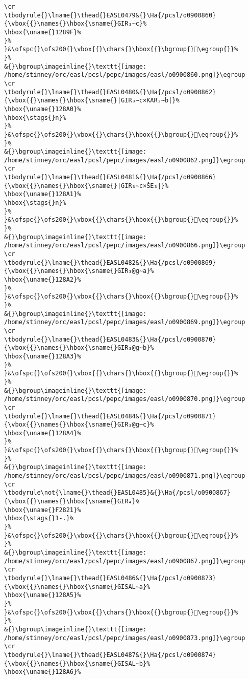 \begin{verbatim}
\cr
\tbodyrule{}\lname{}\thead{}EASL0479&{}\Ha{/pcsl/o0900860}{\vbox{{}\names{}\hbox{\sname{}GIR₃∼c}%
\hbox{\uname{}1289F}%
}%
}&\ofspc{}\ofs200{}\vbox{{}\chars{}\hbox{{}\bgroup{}𒢟\egroup{}}%
}%
&{}\bgroup\imageinline{}\texttt{[image: /home/stinney/orc/easl/pcsl/pepc/images/easl/o0900860.png]}\egroup
\cr
\tbodyrule{}\lname{}\thead{}EASL0480&{}\Ha{/pcsl/o0900862}{\vbox{{}\names{}\hbox{\sname{}|GIR₃∼c×KAR₂∼b|}%
\hbox{\uname{}128A0}%
\hbox{\stags{}n}%
}%
}&\ofspc{}\ofs200{}\vbox{{}\chars{}\hbox{{}\bgroup{}𒢠\egroup{}}%
}%
&{}\bgroup\imageinline{}\texttt{[image: /home/stinney/orc/easl/pcsl/pepc/images/easl/o0900862.png]}\egroup
\cr
\tbodyrule{}\lname{}\thead{}EASL0481&{}\Ha{/pcsl/o0900866}{\vbox{{}\names{}\hbox{\sname{}|GIR₃∼c×ŠE₃|}%
\hbox{\uname{}128A1}%
\hbox{\stags{}n}%
}%
}&\ofspc{}\ofs200{}\vbox{{}\chars{}\hbox{{}\bgroup{}𒢡\egroup{}}%
}%
&{}\bgroup\imageinline{}\texttt{[image: /home/stinney/orc/easl/pcsl/pepc/images/easl/o0900866.png]}\egroup
\cr
\tbodyrule{}\lname{}\thead{}EASL0482&{}\Ha{/pcsl/o0900869}{\vbox{{}\names{}\hbox{\sname{}GIR₃@g∼a}%
\hbox{\uname{}128A2}%
}%
}&\ofspc{}\ofs200{}\vbox{{}\chars{}\hbox{{}\bgroup{}𒢢\egroup{}}%
}%
&{}\bgroup\imageinline{}\texttt{[image: /home/stinney/orc/easl/pcsl/pepc/images/easl/o0900869.png]}\egroup
\cr
\tbodyrule{}\lname{}\thead{}EASL0483&{}\Ha{/pcsl/o0900870}{\vbox{{}\names{}\hbox{\sname{}GIR₃@g∼b}%
\hbox{\uname{}128A3}%
}%
}&\ofspc{}\ofs200{}\vbox{{}\chars{}\hbox{{}\bgroup{}𒢣\egroup{}}%
}%
&{}\bgroup\imageinline{}\texttt{[image: /home/stinney/orc/easl/pcsl/pepc/images/easl/o0900870.png]}\egroup
\cr
\tbodyrule{}\lname{}\thead{}EASL0484&{}\Ha{/pcsl/o0900871}{\vbox{{}\names{}\hbox{\sname{}GIR₃@g∼c}%
\hbox{\uname{}128A4}%
}%
}&\ofspc{}\ofs200{}\vbox{{}\chars{}\hbox{{}\bgroup{}𒢤\egroup{}}%
}%
&{}\bgroup\imageinline{}\texttt{[image: /home/stinney/orc/easl/pcsl/pepc/images/easl/o0900871.png]}\egroup
\cr
\tbodyrule\not{\lname{}\thead{}EASL0485}&{}\Ha{/pcsl/o0900867}{\vbox{{}\names{}\hbox{\sname{}GIR₄}%
\hbox{\uname{}F2821}%
\hbox{\stags{}1-.}%
}%
}&\ofspc{}\ofs200{}\vbox{{}\chars{}\hbox{{}\bgroup{}󲠡\egroup{}}%
}%
&{}\bgroup\imageinline{}\texttt{[image: /home/stinney/orc/easl/pcsl/pepc/images/easl/o0900867.png]}\egroup
\cr
\tbodyrule{}\lname{}\thead{}EASL0486&{}\Ha{/pcsl/o0900873}{\vbox{{}\names{}\hbox{\sname{}GISAL∼a}%
\hbox{\uname{}128A5}%
}%
}&\ofspc{}\ofs200{}\vbox{{}\chars{}\hbox{{}\bgroup{}𒢥\egroup{}}%
}%
&{}\bgroup\imageinline{}\texttt{[image: /home/stinney/orc/easl/pcsl/pepc/images/easl/o0900873.png]}\egroup
\cr
\tbodyrule{}\lname{}\thead{}EASL0487&{}\Ha{/pcsl/o0900874}{\vbox{{}\names{}\hbox{\sname{}GISAL∼b}%
\hbox{\uname{}128A6}%

\end{verbatim}
